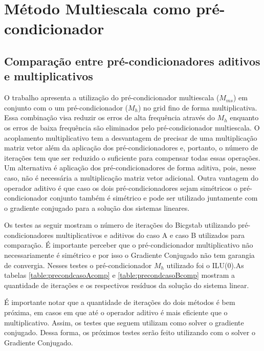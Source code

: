 \section{Método Multiescala como pré-condicionador}

\subsection{Comparação entre pré-condicionadores aditivos e multiplicativos}
O trabalho \cite{casteletto} apresenta a utilização do pré-condicionador multiescala ($M_{ms}$) em conjunto com o um pré-condicionador ($M_h$) no grid fino de forma multiplicativa. 
Essa combinação visa reduzir os erros de alta frequência através do $M_h$ enquanto os erros de baixa frequência são eliminados pelo pré-condicionador multiescala. 
O acoplamento multiplicativo tem a desvantagem de precisar de uma multiplicação matriz vetor além da aplicação dos pré-condicionadores
e, portanto, o número de iterações tem que ser reduzido o suficiente para compensar todas essas operações. Um alternativa é aplicação
dos pré-condicionadores de forma aditiva, pois, nesse caso, não é necessária a multiplicação matriz vetor adicional. Outra vantagem do operador
aditivo é que caso os dois pré-condicionadores sejam simétricos o pré-condicionador conjunto também é simétrico e pode ser utilizado juntamente
com o gradiente conjugado para a solução dos sistemas lineares.


Os testes as seguir mostram o número de iterações do Bicgstab utilizando pré-condicionadores multiplicativos e aditivos do caso A e caso B utilizados para comparação. É importante perceber que o pré-condicionador multiplicativo não necessariamente é simétrico e por isso o Gradiente Conjugado não tem garangia de convergia. Nesses testes o pré-condicionador $M_h$ utilizado foi o ILU(0).As tabelas \ref{table:precondcasoAcomp} e \ref{table:precondcasoBcomp} mostram a quantidade de iterações e os respectivos resíduos da solução do sistema linear.

É importante notar que a quantidade de iterações do dois métodos é bem próxima, em casos em que até o operador aditivo é mais eficiente que o multiplicativo. Assim, os testes que seguem utilizam como solver o gradiente conjugado. Dessa forma, os próximos
testes serão feito utilizando com o solver o Gradiente Conjugado.

